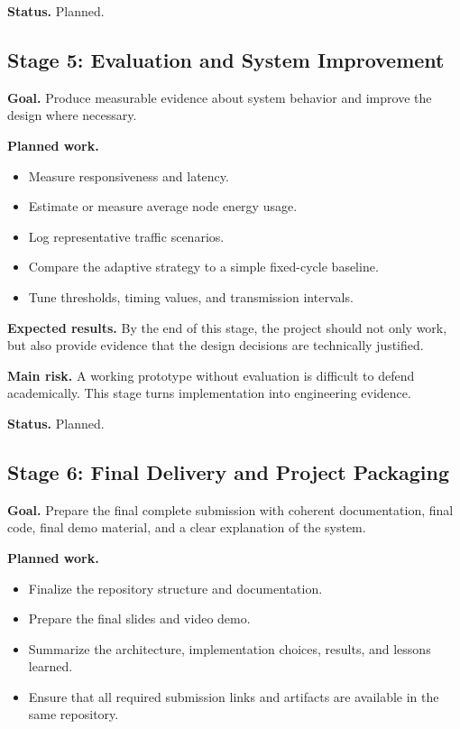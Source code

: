 \documentclass[11pt,a4paper]{article}
\begin{document}
\textbf{Status.} Planned.

\subsection{Stage 5: Evaluation and System Improvement}

\textbf{Goal.} Produce measurable evidence about system behavior and improve the design where necessary.

\textbf{Planned work.}

\begin{itemize}
    \item Measure responsiveness and latency.
    \item Estimate or measure average node energy usage.
    \item Log representative traffic scenarios.
    \item Compare the adaptive strategy to a simple fixed-cycle baseline.
    \item Tune thresholds, timing values, and transmission intervals.
\end{itemize}

\textbf{Expected results.} By the end of this stage, the project should not only work, but also provide evidence that the design decisions are technically justified.

\textbf{Main risk.} A working prototype without evaluation is difficult to defend academically. This stage turns implementation into engineering evidence.

\textbf{Status.} Planned.

\subsection{Stage 6: Final Delivery and Project Packaging}

\textbf{Goal.} Prepare the final complete submission with coherent documentation, final code, final demo material, and a clear explanation of the system.

\textbf{Planned work.}

\begin{itemize}
    \item Finalize the repository structure and documentation.
    \item Prepare the final slides and video demo.
    \item Summarize the architecture, implementation choices, results, and lessons learned.
    \item Ensure that all required submission links and artifacts are available in the same repository.
\end{itemize}
\end{document}
